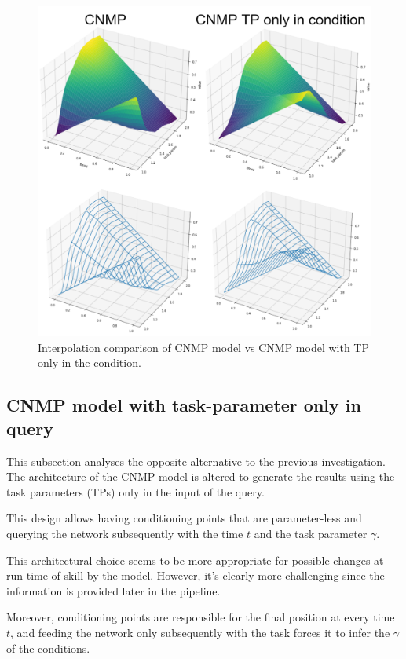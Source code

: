 \begin{figure}
    \centering
    \includegraphics[width=0.8\linewidth]{figures/comparisonCNMPvsCNMPonlyTPcondition.png}
    \caption{ Interpolation comparison of CNMP model vs CNMP model with TP only in the condition. }
    \label{fig:comparisonCNMPvsCNMPonlyTPcondition}
\end{figure}



\subsection{CNMP model with task-parameter only in query}
This subsection analyses the opposite alternative to the previous investigation. The architecture of the CNMP model is altered to generate the results using the task parameters (TPs) only in the input of the query.

This design allows having conditioning points that are parameter-less and querying the network subsequently with the time $t$ and the task parameter $\gamma$. 

This architectural choice seems to be more appropriate for possible changes at run-time of skill by the model. However, it's clearly more challenging since the information is provided later in the pipeline. 

Moreover, conditioning points are responsible for the final position at every time $t$, and feeding the network only subsequently with the task forces it to infer the $\gamma$ of the conditions. 

